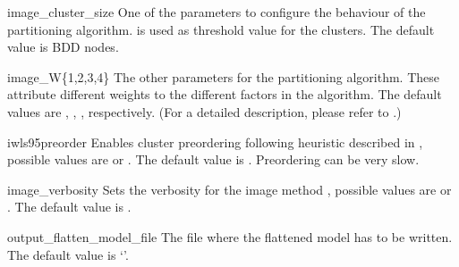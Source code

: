 
\begin{nusmvVar}{image\_cluster\_size}{}{}
One of the parameters to configure the behaviour of the \Iwls
partitioning algorithm.  is used as
threshold value for the clusters. The default value is 
BDD nodes.
\end{nusmvVar}

\begin{nusmvVar}{image\_W\{1,2,3,4\}}{}{}
The other parameters for the \Iwls partitioning algorithm. These
attribute different weights to the different factors in the
algorithm. The default values are , ,
,  respectively. (For a detailed description,
please refer to \cite{RAP+95}.)
\end{nusmvVar}

\begin{nusmvVar} {iwls95preorder}{}{}
Enables cluster preordering following heuristic described in
\cite{RAP+95}, possible values are  or . The
default value is . Preordering can be very slow.
\end{nusmvVar}

\begin{nusmvVar} {image\_verbosity}{}{}
Sets the verbosity for the image method \Iwls, possible values
are  or . The default value is .
\end{nusmvVar}






\begin{nusmvVar} {output\_flatten\_model\_file}{}{}
The file where the flattened model has to be written. The default value is
`'.
\end{nusmvVar}

